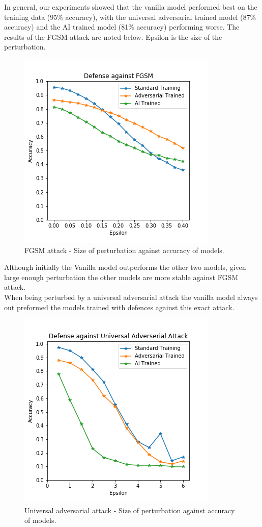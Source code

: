 In general, our experiments showed that the vanilla model performed best on the training data (95\% accuracy), with the universal adversarial trained model (87\% accuracy) and the AI trained model (81\% accuracy) performing worse. The results of the FGSM attack are noted below. Epsilon is the size of the perturbation.

\begin{figure}[!ht]
\centering
	\includegraphics[scale=0.5]{Advsarial_code/figures/doc_defense_against_FGSM.png}
	\caption{FGSM attack - Size of perturbation against accuracy of models.}
\end{figure}

Although initially the Vanilla model outperforms the other two models, given large enough perturbation the other models are more stable against FGSM attack.\\ 

When being perturbed by a universal adversarial attack the vanilla model always out preformed the models trained with defences against this exact attack. 

\begin{figure}[!ht]
\centering
	\includegraphics[scale=0.5]{Advsarial_code/figures/doc_defense_against_UAA.png}
	\caption{Universal adversarial attack - Size of perturbation against accuracy of models.}
\end{figure}

